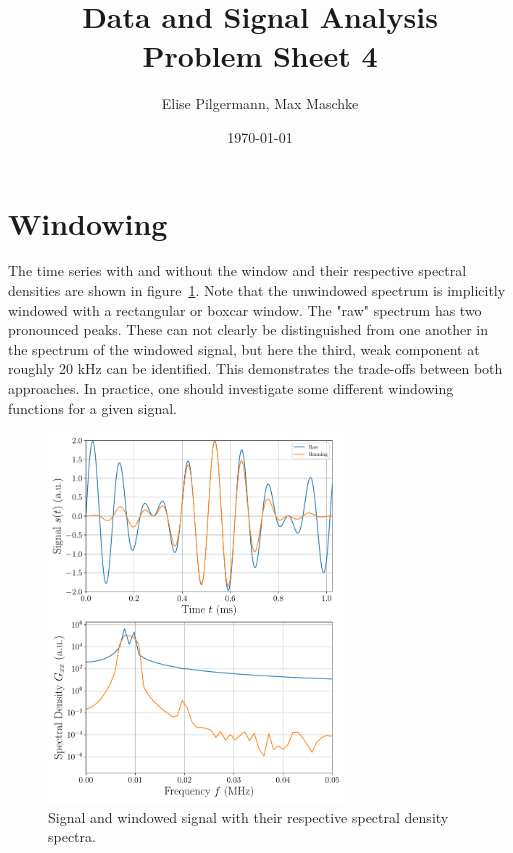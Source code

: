 \documentclass[a4paper,DIV=12,english]{scrartcl}
\title{Data and Signal Analysis\\Problem Sheet 4}
\author{Elise Pilgermann, Max Maschke}
\date{\today}
\begin{document}
\maketitle

\section{Windowing}
The time series with and without the window and their respective spectral densities are shown in figure~\ref{fig:window}. Note that the unwindowed spectrum is implicitly windowed with a rectangular or boxcar window. The "raw" spectrum has two pronounced peaks. These can not clearly be distinguished from one another in the spectrum of the windowed signal, but here the third, weak component at roughly 20 kHz can be identified. This demonstrates the trade-offs between both approaches. In practice, one should investigate some different windowing functions for a given signal. 

\begin{figure}[h]
    \centering
    \includegraphics[width=0.7\textwidth]{../signal.pdf}
    \caption{Signal and windowed signal with their respective spectral density spectra.}
    \label{fig:window}
\end{figure}

\FloatBarrier
\newpage
\end{document}
